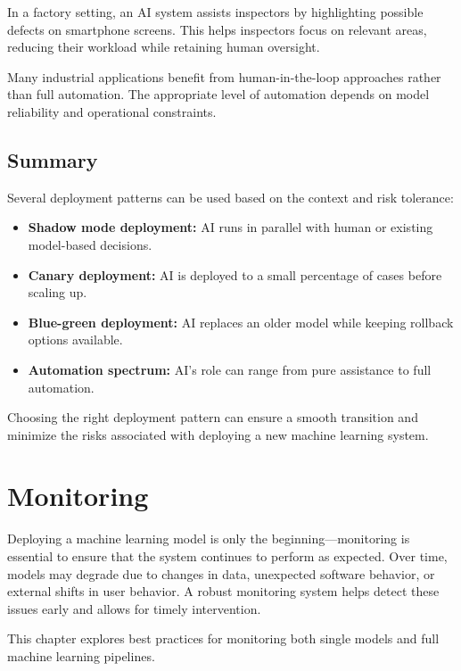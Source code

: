 \documentclass[12pt,openany, draft]{book}
\begin{document}
\begin{examplebox}
   In a factory setting, an AI system assists inspectors by highlighting possible defects on smartphone screens. This helps inspectors focus on relevant areas, reducing their workload while retaining human oversight.
\end{examplebox}

Many industrial applications benefit from human-in-the-loop approaches rather than full automation. The appropriate level of automation depends on model reliability and operational constraints.



\section{Summary}

Several deployment patterns can be used based on the context and risk tolerance:

\begin{itemize}
    \item \textbf{Shadow mode deployment:} AI runs in parallel with human or existing model-based decisions.
    \item \textbf{Canary deployment:} AI is deployed to a small percentage of cases before scaling up.
    \item \textbf{Blue-green deployment:} AI replaces an older model while keeping rollback options available.
    \item \textbf{Automation spectrum:} AI’s role can range from pure assistance to full automation.
\end{itemize}

Choosing the right deployment pattern can ensure a smooth transition and minimize the risks associated with deploying a new machine learning system.




\chapter{Monitoring}

Deploying a machine learning model is only the beginning—monitoring is essential to ensure that the system continues to perform as expected. Over time, models may degrade due to changes in data, unexpected software behavior, or external shifts in user behavior. A robust monitoring system helps detect these issues early and allows for timely intervention.

This chapter explores best practices for monitoring both single models and full machine learning pipelines.
\end{document}
